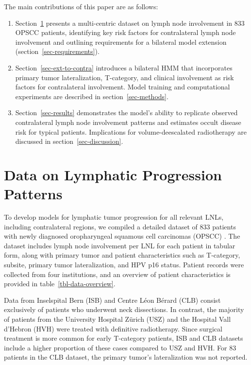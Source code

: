 \documentclass[
  sn-mathphys-num,
]{sn-jnl}
\begin{document}
The main contributions of this paper are as follows:

\begin{enumerate}
\def\labelenumi{\arabic{enumi}.}
\item
  Section~\ref{sec-data} presents a multi-centric dataset on lymph node
  involvement in 833 OPSCC patients, identifying key risk factors for
  contralateral lymph node involvement and outlining requirements for a
  bilateral model extension (section~\ref{sec-requirements}).
\item
  Section~\ref{sec-ext-to-contra} introduces a bilateral HMM that
  incorporates primary tumor lateralization, T-category, and clinical
  involvement as risk factors for contralateral involvement. Model
  training and computational experiments are described in
  section~\ref{sec-methods}.
\item
  Section~\ref{sec-results} demonstrates the model's ability to
  replicate observed contralateral lymph node involvement patterns and
  estimates occult disease risk for typical patients. Implications for
  volume-deescalated radiotherapy are discussed in
  section~\ref{sec-discussion}.
\end{enumerate}

\section{Data on Lymphatic Progression Patterns}\label{sec-data}

To develop models for lymphatic tumor progression for all relevant LNLs,
including contralateral regions, we compiled a detailed dataset of 833
patients with newly diagnosed oropharyngeal squamous cell carcinomas
(OPSCC) \citep{ludwig_dataset_2022, ludwig_multicentric_2024}. The
dataset includes lymph node involvement per LNL for each patient in
tabular form, along with primary tumor and patient characteristics such
as T-category, subsite, primary tumor lateralization, and HPV p16
status. Patient records were collected from four institutions, and an
overview of patient characteristics is provided in
table~\ref{tbl-data-overview}.

Data from Inselspital Bern (ISB) and Centre Léon Bérard (CLB) consist
exclusively of patients who underwent neck dissections. In contrast, the
majority of patients from the University Hospital Zürich (USZ) and the
Hospital Vall d'Hebron (HVH) were treated with definitive radiotherapy.
Since surgical treatment is more common for early T-category patients,
ISB and CLB datasets include a higher proportion of these cases compared
to USZ and HVH. For 83 patients in the CLB dataset, the primary tumor's
lateralization was not reported.
\end{document}

